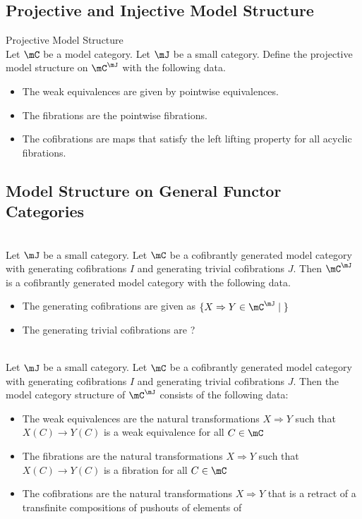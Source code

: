 \documentclass[a4paper]{article}
\begin{document}
\subsection{Projective and Injective Model Structure}
\begin{defn}{Projective Model Structure}{}\\
Let $\mC$ be a model category. Let $\mJ$ be a small category. Define the projective model structure on $\mC^\mJ$ with the following data. 
\begin{itemize}
\item The weak equivalences are given by pointwise equivalences. 
\item The fibrations are the pointwise fibrations. 
\item The cofibrations are maps that satisfy the left lifting property for all acyclic fibrations. 
\end{itemize}
\end{defn}

\subsection{Model Structure on General Functor Categories}
\begin{thm}{}{}\\ Let $\mJ$ be a small category. Let $\mC$ be a cofibrantly generated model category with generating cofibrations $I$ and generating trivial cofibrations $J$. Then $\mC^\mJ$ is a cofibrantly generated model category with the following data. 
\begin{itemize}
\item The generating cofibrations are given as $\{X\Rightarrow Y\in\mC^\mJ\;|\;\}$
\item The generating trivial cofibrations are ?
\end{itemize}
\end{thm}

\begin{prp}{}{}\\ Let $\mJ$ be a small category. Let $\mC$ be a cofibrantly generated model category with generating cofibrations $I$ and generating trivial cofibrations $J$. Then the model category structure of $\mC^\mJ$ consists of the following data: 
\begin{itemize}
\item The weak equivalences are the natural transformations $X\Rightarrow Y$ such that $X(C)\to Y(C)$ is a weak equivalence for all $C\in\mC$
\item The fibrations are the natural transformations $X\Rightarrow Y$ such that $X(C)\to Y(C)$ is a fibration for all $C\in\mC$
\item The cofibrations are the natural transformations $X\Rightarrow Y$ that is a retract of a transfinite compositions of pushouts of elements of 
\end{itemize}
\end{prp}
\end{document}
